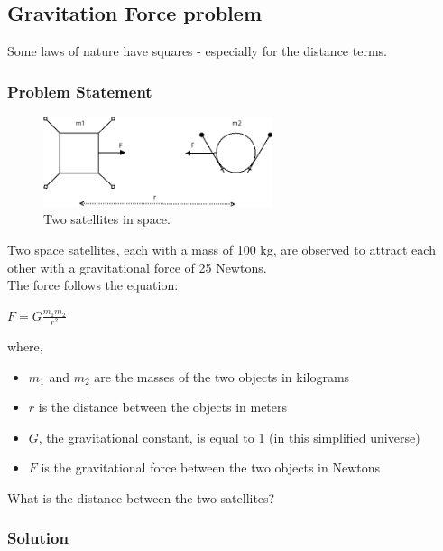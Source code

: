 \documentclass{hw}
\begin{document}
\subsection*{\normalsize Gravitation Force problem}
Some laws of nature have squares - especially for the distance terms.

\subsubsection*{\normalsize Problem Statement}

\begin{figure}[h]
    \centering
    \includegraphics[width=0.6\textwidth]{dia/radicals-satellites.png}
    \caption{Two satellites in space.}
    \label{fig:satellites}
\end{figure}

Two space satellites, each with a mass of 100 kg, are observed to attract each other with a gravitational force of 25 Newtons.\\
The force follows the equation:

{\centering
$F = G \frac{m_1 m_2}{r^2}$
\par}

where,
\begin{itemize}
    \item $m_1$ and $m_2$ are the masses of the two objects in kilograms
    \item $r$ is the distance between the objects in meters
    \item $G$, the gravitational constant, is equal to 1 (in this simplified universe)
    \item $F$ is the gravitational force between the two objects in Newtons 
\end{itemize}
\bigskip
What is the distance between the two satellites?

\subsubsection*{\normalsize Solution}

\end{document}
